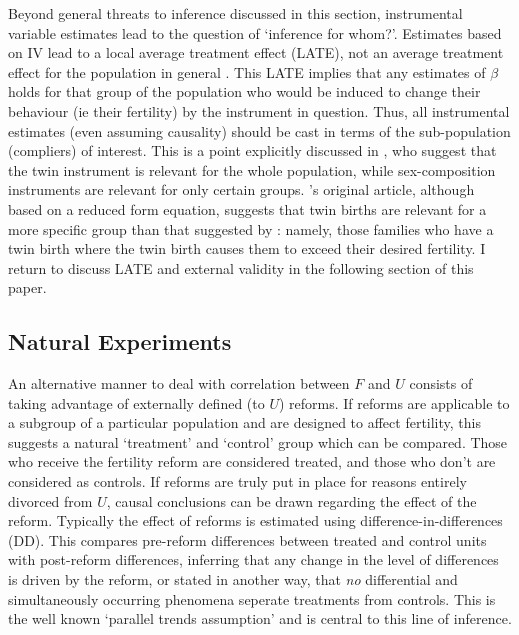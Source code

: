 Beyond general threats to inference discussed in this section, instrumental 
variable estimates lead to the question of `inference for whom?'.  Estimates 
based on IV lead to a local average treatment effect (LATE), not an average 
treatment effect for the population in general \citep{ImbensAngrist1994}.  This 
LATE implies that any estimates of $\beta$ holds for that group of the population 
who would be induced to change their behaviour (ie their fertility) by the 
instrument in question.  Thus, all instrumental estimates (even assuming causality)
should be cast in terms of the sub-population (compliers) of interest.  This is
a point explicitly discussed in \citet{Angristetal2010}, who suggest that the
twin instrument is relevant for the whole population, while sex-composition 
instruments are relevant for only certain groups. \citet{RosenzweigWolpin1980}'s 
original article, although based on a reduced form equation, suggests that twin 
births are relevant for a more specific group than that suggested by 
\citet{Angristetal2010}: namely, those families who have a twin birth where
the twin birth causes them to exceed their desired fertility.  I return to discuss 
LATE and external validity in the following section of this paper.



\subsection{Natural Experiments}
\label{Fsscn:kidNExp}
An alternative manner to deal with correlation between $F$ and $U$ consists of
taking advantage of externally defined (to $U$) reforms.  If reforms are 
applicable to a subgroup of a particular population and are designed to affect
fertility, this suggests a natural `treatment' and `control' group which can
be compared.  Those who receive the fertility reform are considered treated, and
those who don't are considered as controls.  If reforms are truly put in place
for reasons entirely divorced from $U$, causal conclusions can be drawn regarding
the effect of the reform.  Typically the effect of reforms is estimated using 
difference-in-differences (DD).  This compares pre-reform differences
between treated and control units with post-reform differences, inferring that
any change in the level of differences is driven by the reform, or stated in
another way, that \emph{no} differential and simultaneously occurring phenomena
seperate treatments from controls.  This is the well known `parallel trends
assumption' and is central to this line of inference.  

